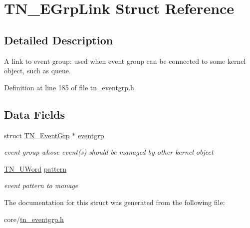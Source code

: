 \hypertarget{structTN__EGrpLink}{\section{T\+N\+\_\+\+E\+Grp\+Link Struct Reference}
\label{structTN__EGrpLink}
}


\subsection{Detailed Description}
A link to event group\+: used when event group can be connected to some kernel object, such as queue. 

Definition at line 185 of file tn\+\_\+eventgrp.\+h.

\subsection*{Data Fields}
\begin{DoxyCompactItemize}
\item 
\hypertarget{structTN__EGrpLink_a033de1028488c16a62718b2e9c8eb37f}{struct \hyperlink{structTN__EventGrp}{T\+N\+\_\+\+Event\+Grp} $\ast$ \hyperlink{structTN__EGrpLink_a033de1028488c16a62718b2e9c8eb37f}{eventgrp}}\label{structTN__EGrpLink_a033de1028488c16a62718b2e9c8eb37f}

\begin{DoxyCompactList}\small\item\em event group whose event(s) should be managed by other kernel object \end{DoxyCompactList}\item 
\hypertarget{structTN__EGrpLink_a576dde889abb0efae1f253c12a1eed64}{\hyperlink{tn__arch__example_8h_ab80cba0fe9ffcd9011d53dfeb9e39bf4}{T\+N\+\_\+\+U\+Word} \hyperlink{structTN__EGrpLink_a576dde889abb0efae1f253c12a1eed64}{pattern}}\label{structTN__EGrpLink_a576dde889abb0efae1f253c12a1eed64}

\begin{DoxyCompactList}\small\item\em event pattern to manage \end{DoxyCompactList}\end{DoxyCompactItemize}


The documentation for this struct was generated from the following file\+:\begin{DoxyCompactItemize}
\item 
core/\hyperlink{tn__eventgrp_8h}{tn\+\_\+eventgrp.\+h}\end{DoxyCompactItemize}
